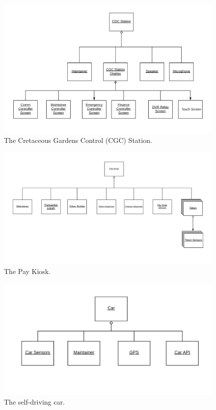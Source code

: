 \documentclass[12pt]{article}
\begin{document}
\begin{figure}[H]
    \centerline{\includegraphics[scale=.20]{CGCStation.png}}
    \caption{The Cretaceous Gardens Control (CGC) Station.}
    \label{fig:CGCStation}
\end{figure}
  
\begin{figure}[H]
    \centerline{\includegraphics[scale=.20]{PayKiosk.png}}
    \caption{The Pay Kiosk.}
    \label{fig:PayKiosk}
\end{figure} 

\begin{figure}[H]
    \centerline{\includegraphics[scale=.20]{Car.png}}
    \caption{The self-driving car.}
    \label{fig:Car}
\end{figure}
\end{document}
